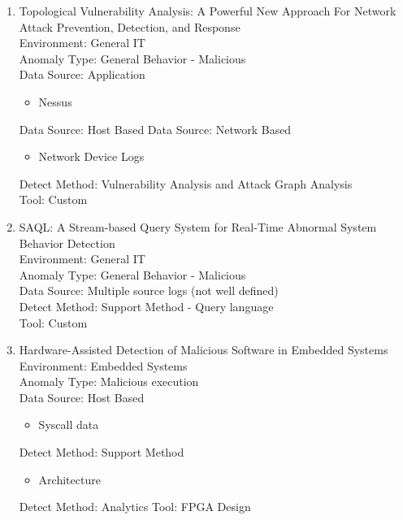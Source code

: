 \begin{enumerate}
    \item 
    Topological Vulnerability Analysis: A Powerful New Approach For Network Attack Prevention, Detection, and Response\cite{jajodia2009topological}\\
    Environment: General IT\\
    Anomaly Type: General Behavior - Malicious \\
    Data Source: Application
    \begin{itemize}
        \item Nessus
    \end{itemize}
    Data Source: Host Based
    Data Source: Network Based
    \begin{itemize}
        \item Network Device Logs
    \end{itemize}
    Detect Method: Vulnerability Analysis and Attack Graph Analysis\\ 
    Tool: Custom
    
    \item 
    SAQL: A Stream-based Query System for Real-Time Abnormal System Behavior Detection\cite{gao2018saql}\\
    Environment: General IT\\
    Anomaly Type: General Behavior - Malicious \\
    Data Source: Multiple source logs (not well defined)\\
    Detect Method: Support Method - Query language\\ 
    Tool: Custom
    
    \item 
    Hardware-Assisted Detection of Malicious Software in Embedded Systems\cite{rahmatian2012hardware}\\
    Environment: Embedded Systems\\
    Anomaly Type: Malicious execution \\
    Data Source: Host Based
    \begin{itemize}
        \item Syscall data
    \end{itemize}
    Detect Method: Support Method 
    \begin{itemize}
        \item Architecture
    \end{itemize}
    Detect Method: Analytics
    Tool: FPGA Design
    

\end{enumerate}
